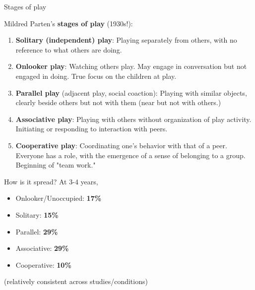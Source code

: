 \documentclass[compress]{beamer}
\begin{document}
\begin{frame}{Stages of play}

    Mildred Parten's {\bf stages of play} (1930s!):

    \begin{enumerate}
        \item<1-> {\bf Solitary (independent) play}: Playing separately from
            others, with no reference to what others are doing.
        \item<2-> {\bf Onlooker play}: Watching others play. May engage in
            conversation but not engaged in doing. True focus on the children at
            play.
        \item<3-> {\bf Parallel play} (adjacent play, social coaction): Playing
            with similar objects, clearly beside others but not with them (near
            but not with others.)
        \item<4-> {\bf Associative play}:  Playing with others without
            organization of play activity. Initiating or responding to
            interaction with peers. 
        \item<5-> {\bf Cooperative play}: Coordinating one’s behavior with that
            of a peer. Everyone has a role, with the emergence of a sense of
            belonging to a group. Beginning of "team work."
    \end{enumerate}

\end{frame}

{
\begin{frame}{How is it spread?}
    At 3-4 years,

    \begin{itemize}
        \item Onlooker/Unoccupied: {\bf 17\%}
        \item Solitary: {\bf 15\%}
        \item Parallel: {\bf 29\%}
        \item Associative: {\bf 29\%}
        \item Cooperative: {\bf 10\%}
    \end{itemize}

    (relatively consistent across studies/conditions)
\end{frame}
}
\end{document}
